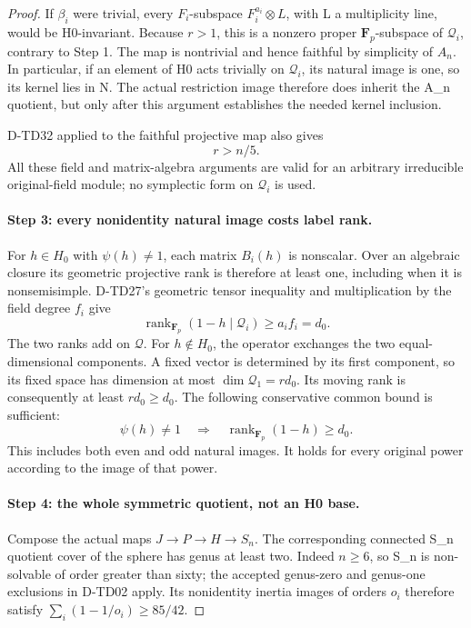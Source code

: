 \begin{proof}
If \(\beta_i\) were trivial, every \(F_i\)-subspace
\(F_i^{a_i}\otimes L\), with L a multiplicity line, would
be H0-invariant.  Because \(r>1\), this is a nonzero proper
\(\mathbf F_p\)-subspace of \(\mathcal Q_i\), contrary
to Step 1.  The map is nontrivial and hence faithful by
simplicity of \(A_n\).  In particular, if an element of H0
acts trivially on \(\mathcal Q_i\), its natural image is
one, so its kernel lies in N.  The actual restriction image
therefore does inherit the A_n quotient, but only after this
argument establishes the needed kernel inclusion.

D-TD32 applied to the faithful projective map also gives
\[
                             r>n/5.
 \tag{TSI.8}
\]
All these field and matrix-algebra arguments are valid for an
arbitrary irreducible original-field module; no symplectic form
on \(\mathcal Q_i\) is used.

\paragraph{Step 3: every nonidentity natural image costs label rank.}
For \(h\in H_0\) with \(\psi(h)\ne1\), each matrix
\(B_i(h)\) is nonscalar.  Over an algebraic closure its
geometric projective rank is therefore at least one, including
when it is nonsemisimple.  D-TD27's geometric tensor inequality
and multiplication by the field degree \(f_i\) give
\[
 \operatorname{rank}_{\mathbf F_p}(1-h\mid\mathcal Q_i)
                       \ge a_i f_i=d_0.
 \tag{TSI.9}
\]
The two ranks add on \(\mathcal Q\).  For \(h\notin H_0\),
the operator exchanges the two equal-dimensional components.
A fixed vector is determined by its first component, so its
fixed space has dimension at most \(\dim\mathcal Q_1=r d_0\).
Its moving rank is consequently at least \(r d_0\ge d_0\).
The following conservative common bound is sufficient:
\[
       \psi(h)\ne1\quad\Longrightarrow\quad
       \operatorname{rank}_{\mathbf F_p}(1-h)\ge d_0.
 \tag{TSI.10}
\]
This includes both even and odd natural images.  It holds for
every original power according to the image of that power.

\paragraph{Step 4: the whole symmetric quotient, not an H0 base.}
Compose the actual maps \(J\to P\to H\to S_n\).
The corresponding connected S_n quotient cover of the sphere
has genus at least two.  Indeed \(n\ge6\), so S_n is
non-solvable of order greater than sixty; the accepted genus-zero
and genus-one exclusions in D-TD02 apply.  Its nonidentity
inertia images of orders \(o_i\) therefore satisfy
\(\sum_i(1-1/o_i)\ge85/42\).


\end{proof}
